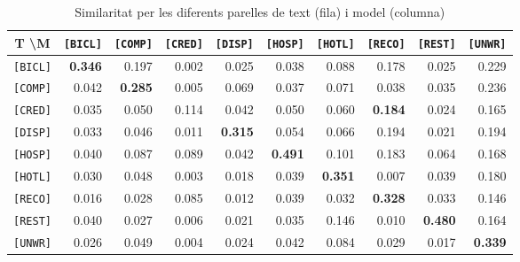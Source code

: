 \begin{table}[htbp]
\begin{tabular}{l||r|r|r|r|r|r|r|r|r||}
    \multicolumn{1}{c|}{T \textbackslash M} & \multicolumn{1}{l|}{\texttt{[BICL]}} & \multicolumn{1}{l|}{\texttt{[COMP]}} & \multicolumn{1}{l|}{\texttt{[CRED]}} & \multicolumn{1}{l|}{\texttt{[DISP]}} & \multicolumn{1}{l|}{\texttt{[HOSP]}} & \multicolumn{1}{l|}{\texttt{[HOTL]}} & \multicolumn{1}{l|}{\texttt{[RECO]}} & \multicolumn{1}{l|}{\texttt{[REST]}} & \multicolumn{1}{l||}{\texttt{[UNWR]}} \\ \hline\hline
\texttt{[BICL]} & \textbf{0.346} & 0.197 & 0.002 & 0.025 & 0.038 & 0.088 & 0.178 & 0.025 & 0.229 \\ \hline
\texttt{[COMP]} & 0.042 & \textbf{0.285} & 0.005 & 0.069 & 0.037 & 0.071 & 0.038 & 0.035 & 0.236 \\ \hline
\texttt{[CRED]} & 0.035 & 0.050 & 0.114 & 0.042 & 0.050 & 0.060 & \textbf{0.184} & 0.024 & 0.165 \\ \hline
\texttt{[DISP]} & 0.033 & 0.046 & 0.011 & \textbf{0.315} & 0.054 & 0.066 & 0.194 & 0.021 & 0.194 \\ \hline
\texttt{[HOSP]} & 0.040 & 0.087 & 0.089 & 0.042 & \textbf{0.491} & 0.101 & 0.183 & 0.064 & 0.168 \\ \hline
\texttt{[HOTL]} & 0.030 & 0.048 & 0.003 & 0.018 & 0.039 & \textbf{0.351} & 0.007 & 0.039 & 0.180 \\ \hline
\texttt{[RECO]} & 0.016 & 0.028 & 0.085 & 0.012 & 0.039 & 0.032 & \textbf{0.328} & 0.033 & 0.146 \\ \hline
\texttt{[REST]} & 0.040 & 0.027 & 0.006 & 0.021 & 0.035 & 0.146 & 0.010 & \textbf{0.480} & 0.164 \\ \hline
\texttt{[UNWR]} & 0.026 & 0.049 & 0.004 & 0.024 & 0.042 & 0.084 & 0.029 & 0.017 & \textbf{0.339} \\ \hline\hline
\end{tabular}
\caption{Similaritat per les diferents parelles de text (fila) i model (columna)}
\label{tab:experiment2-result1}
\end{table}

